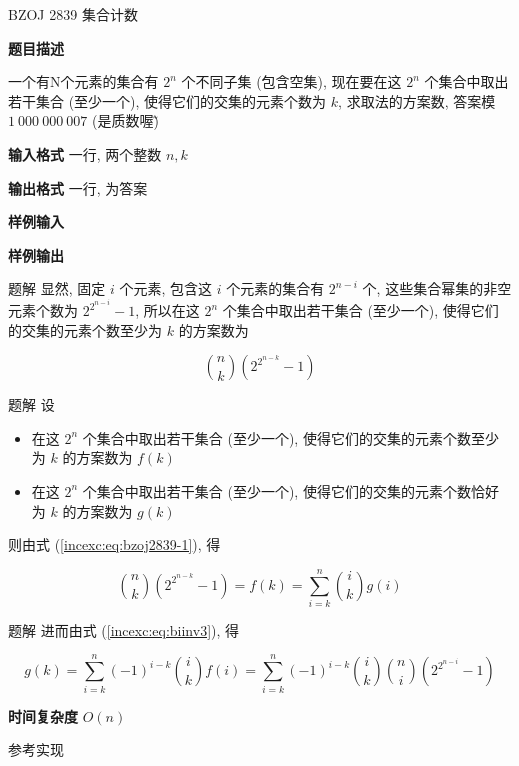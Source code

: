 \begin{frame}[fragile]{BZOJ 2839 集合计数}
	\label{incexc:example:bzoj2839}

	\textbf{题目描述}

	一个有N个元素的集合有 \(2^n\) 个不同子集 (包含空集), 现在要在这 \(2^n\) 个集合中取出若干集合 (至少一个), 使得它们的交集的元素个数为 \(k\), 求取法的方案数, 答案模 \(1~000~000~007\) (是质数喔\~)

	\textbf{输入格式}\xspace 一行, 两个整数 \(n,k\)

	\textbf{输出格式}\xspace 一行, 为答案

	\textbf{样例输入}


	\textbf{样例输出}

\end{frame}


\begin{frame}{题解}
	显然, 固定 \(i\) 个元素, 包含这 \(i\) 个元素的集合有 \(2^{n-i}\) 个, 这些集合幂集的非空元素个数为 \(2^{2^{n-i}}-1\), 所以在这 \(2^n\) 个集合中取出若干集合 (至少一个), 使得它们的交集的元素个数至少为 \(k\) 的方案数为

	\pause
	\begin{equation}
		\label{incexc:eq:bzoj2839-1}
		\binom{n}{k}\left(2^{2^{n-k}}-1\right)
	\end{equation}
\end{frame}


\begin{frame}{题解}
	设
	\begin{itemize}
		\item 在这 \(2^n\) 个集合中取出若干集合 (至少一个), 使得它们的交集的元素个数至少为 \(k\) 的方案数为 \(f(k)\)
		\item 在这 \(2^n\) 个集合中取出若干集合 (至少一个), 使得它们的交集的元素个数恰好为 \(k\) 的方案数为 \(g(k)\)
	\end{itemize}

	\pause
	则由式 (\ref{incexc:eq:bzoj2839-1}), 得

	\begin{equation}
		\binom{n}{k}\left(2^{2^{n-k}}-1\right)=f(k)=\sum_{i=k}^n\binom{i}{k}g(i)
	\end{equation}
\end{frame}


\begin{frame}{题解}
	进而由式 (\ref{incexc:eq:biinv3}), 得

	\pause
	\begin{equation}
		g(k)=\sum_{i=k}^n(-1)^{i-k}\binom{i}{k}f(i)=\sum_{i=k}^n(-1)^{i-k}\binom{i}{k}\binom{n}{i}\left(2^{2^{n-i}}-1\right)
	\end{equation}

	\textbf{时间复杂度} \(O(n)\)
\end{frame}


\begin{frame}{参考实现}
\end{frame}
